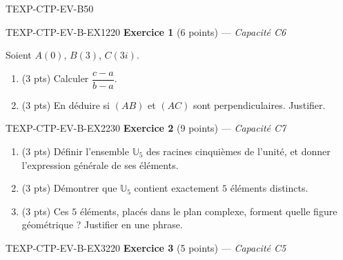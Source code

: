 

\begin{evaluation}{TEXP-CTP-EV-B}{50}

\begin{exercice}{TEXP-CTP-EV-B-EX1}{2}{20}
\textbf{Exercice 1} (6 points) --- \textit{Capacité C6}

\medskip

Soient $A(0)$, $B(3)$, $C(3i)$.
\begin{enumerate}
  \item (3 pts) Calculer $\dfrac{c-a}{b-a}$.
  \item (3 pts) En déduire si $(AB)$ et $(AC)$ sont perpendiculaires. Justifier.
\end{enumerate}
\end{exercice}

\begin{exercice}{TEXP-CTP-EV-B-EX2}{2}{30}
\textbf{Exercice 2} (9 points) --- \textit{Capacité C7}

\medskip

\begin{enumerate}
  \item (3 pts) Définir l'ensemble $\mathbb{U}_5$ des racines cinquièmes de l'unité, et donner l'expression générale de ses éléments.
  \item (3 pts) Démontrer que $\mathbb{U}_5$ contient exactement $5$ éléments distincts.
  \item (3 pts) Ces $5$ éléments, placés dans le plan complexe, forment quelle figure géométrique ? Justifier en une phrase.
\end{enumerate}
\end{exercice}

\begin{exercice}{TEXP-CTP-EV-B-EX3}{2}{20}
\textbf{Exercice 3} (5 points) --- \textit{Capacité C5}


\end{exercice}
\end{evaluation}
